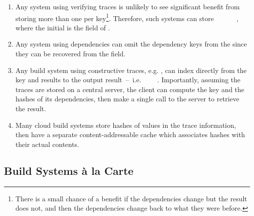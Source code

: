 \begin{enumerate}
\item Any system using verifying traces is unlikely to see significant benefit
from storing more than one  per key\footnote{There is a small chance
of a benefit if the dependencies change but the result does not, and then the
dependencies change back to what they were before.}. Therefore, such systems can
store ~~~~~~, where the
initial  is the  field of .

\item Any system using  dependencies can omit the dependency
keys from the  since they can be recovered from the  field.

\item Any  build system using constructive traces, e.g.
\CloudBuild, can index directly from the key and results to the output result~--~i.e.
~~\hs{[Hash}~\hs{v])}~. Importantly, assuming the traces
are stored on a central server, the client can compute the key and the hashes of
its dependencies, then make a single call to the server to retrieve the result.

\item Many cloud build systems store hashes of values in the trace information,
then have a separate content-addressable cache which associates hashes with
their actual contents.
\end{enumerate}

\subsection{Build Systems \`a la Carte}\label{sec-design-space}

